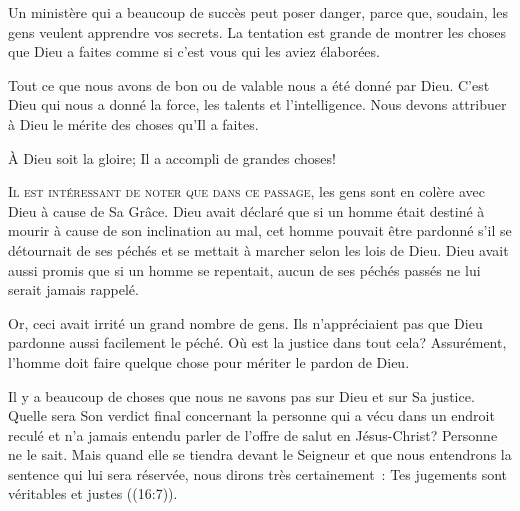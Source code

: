 Un ministère qui a beaucoup de succès peut poser danger, parce que,
 soudain, les gens veulent apprendre vos secrets.
 La tentation est grande de montrer les choses que Dieu a faites
 comme si c'est vous qui les aviez élaborées.

Tout ce que nous avons de bon ou de valable nous a été donné par Dieu.
 C'est Dieu qui nous a donné la force, les talents et l'intelligence.
 Nous devons attribuer à Dieu le mérite des choses qu'Il a faites.

À Dieu soit la gloire; Il a accompli de grandes choses!


\dvrule






\lettrine{I}{l est intéressant de noter que dans ce passage,}
 les gens sont en colère avec Dieu à cause de Sa Grâce.
 Dieu avait déclaré que si un homme était destiné à mourir
 à cause de son inclination au mal, cet homme pouvait être pardonné
 s'il se détournait de ses péchés et se mettait à marcher
 selon les lois de Dieu. Dieu avait aussi promis que si un homme se repentait,
 aucun de ses péchés passés ne lui serait jamais rappelé. 

Or, ceci avait irrité un grand nombre de gens. Ils n'appréciaient pas que Dieu
 pardonne aussi facilement le péché. Où est la justice dans tout cela?
 Assurément, l'homme doit faire quelque chose pour mériter le pardon de Dieu. 

Il y a beaucoup de choses que nous ne savons pas sur Dieu et sur Sa justice.
 Quelle sera Son verdict final concernant la personne qui a vécu
 dans un endroit reculé et n'a jamais entendu parler de l'offre de salut
 en Jésus-Christ? Personne ne le sait. Mais quand elle se tiendra
 devant le Seigneur et que nous entendrons la sentence qui lui sera réservée,
 nous dirons très certainement~: 
 \og Tes jugements sont véritables et justes \fg{} ((16:7)). 



